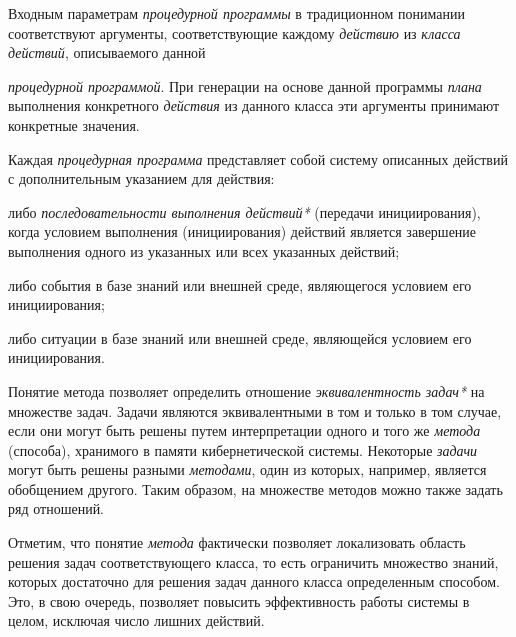 Входным параметрам \textit{процедурной программы} в традиционном понимании соответствуют аргументы, соответствующие каждому \textit{действию} из \textit{класса действий}, описываемого данной {\textit{процедурной программой}. При генерации на основе данной программы \textit{плана} выполнения конкретного \textit{действия} из данного класса эти аргументы принимают конкретные значения.

Каждая \textit{процедурная программа} представляет собой систему описанных действий с дополнительным указанием для действия:
\begin{textitemize}
	\item либо \textit{последовательности выполнения действий*} (передачи инициирования), когда условием выполнения (инициирования) действий является завершение выполнения одного из указанных или всех указанных действий;
	\item либо события в базе знаний или внешней среде, являющегося условием его инициирования;
	\item либо ситуации в базе знаний или внешней среде, являющейся условием его инициирования.
\end{textitemize}
}

Понятие метода позволяет определить отношение \textit{эквивалентность задач*} на множестве задач. Задачи являются эквивалентными в том и только в том случае, если они могут быть решены путем интерпретации одного и того же \textit{метода} (способа), хранимого в памяти кибернетической системы.
Некоторые \textit{задачи} могут быть решены разными \textit{методами}, один из которых, например, является обобщением другого. Таким образом, на множестве методов можно также задать ряд отношений.

Отметим, что понятие \textit{метода} фактически позволяет локализовать область решения задач соответствующего класса, то есть ограничить множество знаний, которых достаточно для решения задач данного класса определенным способом. Это, в свою очередь, позволяет повысить эффективность работы системы в целом, исключая число лишних действий.

